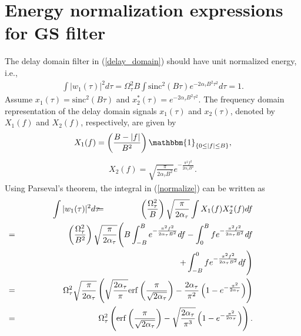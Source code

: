 \vspace{-2mm}
\appendices
\section{Energy normalization expressions for GS filter}
\label{appxA}
The delay domain filter in (\ref{delay_domain}) should have unit normalized energy, i.e.,
\begin{align}
\int |w_1(\tau)|^{2}d\tau=\Omega_{\tau}^{2}B\int \mathrm{sinc}^{2}(B\tau)e^{-2\alpha_{\tau}B^{2}\tau^{2}}d\tau=1.
\label{normalize}
\end{align}
Assume $x_1(\tau)=\mathrm{sinc}^{2}(B\tau)$ and $x_2^{*}(\tau)=e^{-2\alpha_{\tau}B^{2}\tau^{2}}$. The frequency domain representation of the delay domain signals $x_1(\tau)$ and $x_2(\tau)$, denoted by $X_1(f)$ and $X_2(f)$, respectively, 
are given by
\begin{align}
X_1(f)=\left(\frac{B-|f|}{B^{2}}\right)\mathbbm{1}_{\{0\leq |f|\leq B\}},
\end{align}
\begin{align}
X_2(f)=\sqrt{\frac{\pi}{2\alpha_{\tau}B^{2}}}e^{-\frac{\pi^{2}f^{2}}{2\alpha_{\tau}B^{2}}}.
\end{align}
Using Parseval's theorem, the integral in (\ref{normalize}) can be written as
\vspace{0mm}
\begin{eqnarray}
\int |w_{1}(\tau)|^{2}d\tau & \hspace{-2mm} = & \hspace{-2mm} \left(\frac{\Omega_{\tau}^{2}}{B}\right)\sqrt{\frac{\pi}{2\alpha_{\tau}}}\int X_1(f)X_2^{*}(f)df \nonumber \\
& \hspace{-40mm} = & \hspace{-21mm} \left(\frac{\Omega_{\tau}^{2}}{B^{2}}\right)\sqrt{\frac{\pi}{2\alpha_{\tau}}}\Bigg(B\int_{-B}^{B}e^{-\frac{\pi^{2}f^{2}}{2\alpha_{\tau}B^{2}}}df-\int_{0}^{B}fe^{-\frac{\pi^{2}f^{2}}{2\alpha_{\tau}B^{2}}}df \nonumber \\ 
& \hspace{-40mm} & \hspace{-22mm} +\int_{-B}^{0}fe^{-\frac{\pi^{2}f^{2}}{2\alpha_{\tau}B^{2}}}df \Bigg) \nonumber \\
& \hspace{-40mm} = & \hspace{-21mm} \Omega_{\tau}^{2}\sqrt{\frac{\pi}{2\alpha_{\tau}}}\left(\sqrt{\frac{2\alpha_{\tau}}{\pi}}\mathrm{erf}\left(\frac{\pi}{\sqrt{2\alpha_{\tau}}}\right)-\frac{2\alpha_{\tau}}{\pi^{2}}\left(1-e^{-\frac{\pi^{2}}{2\alpha_{\tau}}}\right)\right) \nonumber \\
& \hspace{-40mm} = & \hspace{-21mm} \Omega_{\tau}^{2}\left(\mathrm{erf}\left(\frac{\pi}{\sqrt{2\alpha_{\tau}}}\right)-\sqrt{\frac{2\alpha_{\tau}}{\pi^{3}}}\left(1-e^{-\frac{\pi^{2}}{2\alpha_{\tau}}}\right)\right).
\label{normalize_1}
\end{eqnarray}

